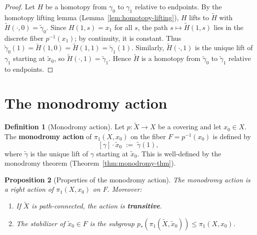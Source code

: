 \documentclass[12pt,a4paper,openany]{book}
\theoremstyle{definition}
\newtheorem{definition}{Definition}[chapter]
\theoremstyle{plain}
\newtheorem{proposition}[definition]{Proposition}
\theoremstyle{remark}
\begin{document}
\begin{proof}
  Let $H$ be a homotopy from $\gamma_0$ to $\gamma_1$ relative to endpoints.
  By the homotopy lifting lemma (Lemma~\ref{lem:homotopy-lifting}), $H$ lifts
  to $\widetilde{H}$ with $\widetilde{H}(\cdot, 0) = \tilde{\gamma}_0$.
  Since $H(1,s) = x_1$ for all $s$, the path $s \mapsto \widetilde{H}(1,s)$
  lies in the discrete fiber $p^{-1}(x_1)$; by continuity, it is constant.
  Thus $\tilde{\gamma}_0(1) = \widetilde{H}(1,0) = \widetilde{H}(1,1) =
  \tilde{\gamma}_1(1)$.  Similarly, $\widetilde{H}(\cdot, 1)$ is the unique
  lift of $\gamma_1$ starting at $\tilde{x}_0$, so
  $\widetilde{H}(\cdot, 1) = \tilde{\gamma}_1$.  Hence $\widetilde{H}$ is a
  homotopy from $\tilde{\gamma}_0$ to $\tilde{\gamma}_1$ relative to
  endpoints.
\end{proof}

\section{The monodromy action}\label{sec:monodromy-action}

\begin{definition}[Monodromy action]\label{def:monodromy-action}
  Let $p\colon \widetilde{X} \to X$ be a covering and let $x_0 \in X$.  The
  \textbf{monodromy action} of $\pi_1(X, x_0)$ on the fiber
  $F = p^{-1}(x_0)$ is defined by
  \[
    [\gamma] \cdot \tilde{x}_0 \;:=\; \tilde{\gamma}(1),
  \]
  where $\tilde{\gamma}$ is the unique lift of $\gamma$ starting at
  $\tilde{x}_0$.  This is well-defined by the monodromy theorem
  (Theorem~\ref{thm:monodromy-thm}).
\end{definition}

\begin{proposition}[Properties of the monodromy action]\label{prop:monodromy-props}
  The monodromy action is a right action of $\pi_1(X, x_0)$ on $F$.
  Moreover:
  \begin{enumerate}[label=(\roman*)]
    \item If $\widetilde{X}$ is path-connected, the action is
      \textbf{transitive}.
    \item The stabilizer of $\tilde{x}_0 \in F$ is the subgroup
      $p_*(\pi_1(\widetilde{X}, \tilde{x}_0)) \leq \pi_1(X, x_0)$.
  \end{enumerate}
\end{proposition}
\end{document}
